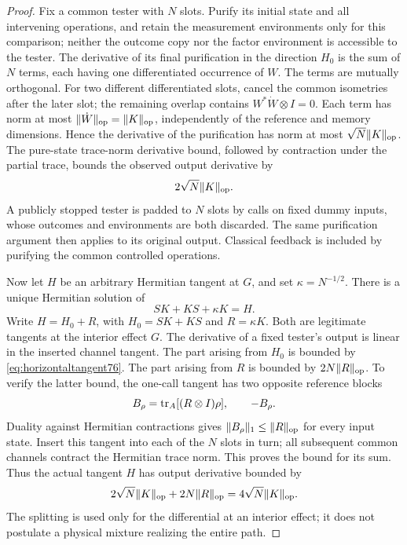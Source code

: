 \begin{proof}
Fix a common tester with $N$ slots.  Purify its initial state and
all intervening operations, and retain the measurement environments
only for this comparison; neither the outcome copy nor the factor
environment is accessible to the tester.  The derivative of its final purification
in the direction $H_0$ is the sum of $N$ terms, each having one
differentiated occurrence of $W$.  The terms are mutually orthogonal.
For two different differentiated slots, cancel the common isometries
after the later slot; the remaining overlap contains
$W^*\dot W\otimes I=0$.  Each term has norm at most
$\|\dot W\|_{\rm op}=\|K\|_{\rm op}$, independently of the
reference and memory dimensions.  Hence the derivative of the
purification has norm at most $\sqrt N\|K\|_{\rm op}$.
The pure-state trace-norm derivative bound, followed by contraction
under the partial trace, bounds the observed output derivative by
\begin{equation}\label{eq:horizontaltangent76}
 2\sqrt N\|K\|_{\rm op}.
\end{equation}
A publicly stopped tester is padded to $N$ slots by calls on fixed
dummy inputs, whose outcomes and environments are both discarded.  The same purification
argument then applies to its original output.  Classical feedback is
included by purifying the common controlled operations.

Now let $H$ be an arbitrary Hermitian tangent at $G$, and set
$\kappa=N^{-1/2}$.  There is a unique Hermitian solution of
\begin{equation}\label{eq:regularizedsylvester76}
 SK+KS+\kappa K=H.
\end{equation}
Write $H=H_0+R$, with $H_0=SK+KS$ and $R=\kappa K$.
Both are legitimate tangents at the interior effect $G$.  The
derivative of a fixed tester's output is linear in the inserted
channel tangent.  The part arising from $H_0$ is bounded by
\eqref{eq:horizontaltangent76}.  The part arising from $R$ is
bounded by $2N\|R\|_{\rm op}$.  To verify the latter bound,
the one-call tangent has two opposite reference blocks
\[
 B_\rho=\operatorname{tr}_A[(R\otimes I)\rho],\qquad -B_\rho.
\]
Duality against Hermitian contractions gives
$\|B_\rho\|_1\le\|R\|_{\rm op}$ for every input state.
Insert this tangent into each of the $N$ slots in turn; all
subsequent common channels contract the Hermitian trace norm.
This proves the bound for its sum.  Thus the actual tangent $H$
has output derivative bounded by
\begin{equation}\label{eq:regularizedtangent76}
 2\sqrt N\|K\|_{\rm op}+2N\|R\|_{\rm op}
                         =4\sqrt N\|K\|_{\rm op}.
\end{equation}
The splitting is used only for the differential at an interior
effect; it does not postulate a physical mixture realizing the
entire path.


\end{proof}
